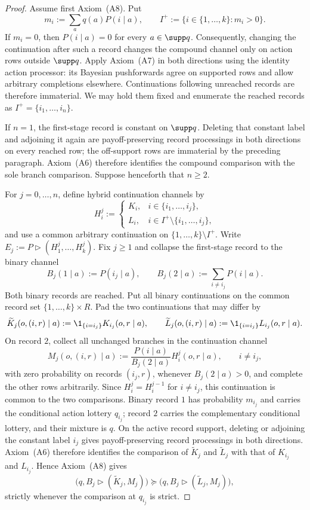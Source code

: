 \begin{proof}
Assume first Axiom~\textup{(A8)}.  Put
\[
 m_i:=\sum_aq(a)P(i\mid a),
 \qquad
 I^+:=\{i\in\{1,\ldots,k\}:m_i>0\}.
\]
If $m_i=0$, then $P(i\mid a)=0$ for every $a\in\supp q$.  Consequently, changing the continuation after such a
record changes the compound channel only on action rows outside $\supp q$.  Apply Axiom~\textup{(A7)} in both
directions using the identity action processor: its Bayesian pushforwards agree on supported rows and allow
arbitrary completions elsewhere.  Continuations following unreached records are therefore immaterial.  We may
hold them fixed and enumerate the reached records as $I^+=\{i_1,\ldots,i_n\}$.

If $n=1$, the first-stage record is constant on $\supp q$.  Deleting that
constant label and adjoining it again are payoff-preserving record processings
in both directions on every reached row; the off-support rows are immaterial
by the preceding paragraph.  Axiom~\textup{(A6)} therefore identifies the
compound comparison with the sole branch comparison.  Suppose henceforth that
$n\ge2$.

For $j=0,\ldots,n$, define hybrid continuation channels by
\[
 H_i^j:=
 \begin{cases}
 K_i,&i\in\{i_1,\ldots,i_j\},\\
 L_i,&i\in I^+\setminus\{i_1,\ldots,i_j\},
 \end{cases}
\]
and use a common arbitrary continuation on $\{1,\ldots,k\}\setminus I^+$.  Write
$E_j:=P\triangleright(H_1^j,\ldots,H_k^j)$.  Fix $j\ge1$ and collapse the first-stage record to the binary channel
\[
 B_j(1\mid a):=P(i_j\mid a),
 \qquad
 B_j(2\mid a):=\sum_{i\ne i_j}P(i\mid a).
\]
Both binary records are reached.  Put all binary continuations on the common record set
$\{1,\ldots,k\}\times R$.  Pad the
two continuations that may differ by
\[
 \widetilde K_j(o,(i,r)\mid a):=\1_{\{i=i_j\}}K_{i_j}(o,r\mid a),
 \qquad
 \widetilde L_j(o,(i,r)\mid a):=\1_{\{i=i_j\}}L_{i_j}(o,r\mid a).
\]
On record $2$, collect all unchanged branches in the continuation channel
\begin{equation}
 M_j(o,(i,r)\mid a)
 :=\frac{P(i\mid a)}{B_j(2\mid a)}H_i^j(o,r\mid a),
 \qquad i\ne i_j,
 \label{pt:eq:complement-continuation}
\end{equation}
with zero probability on records $(i_j,r)$, whenever $B_j(2\mid a)>0$, and complete the other rows arbitrarily.
Since $H_i^j=H_i^{j-1}$ for $i\ne i_j$, this continuation is common to the two comparisons.
Binary record $1$ has probability
$m_{i_j}$ and carries the conditional action lottery $q_{i_j}$; record $2$ carries the complementary conditional
lottery, and their mixture is $q$.  On the active record support, deleting or
adjoining the constant label $i_j$ gives payoff-preserving record processings
in both directions.  Axiom~\textup{(A6)} therefore identifies the comparison
of $\widetilde K_j$ and $\widetilde L_j$ with that of $K_{i_j}$ and $L_{i_j}$.
Hence Axiom~\textup{(A8)} gives
\[
 \bigl(q,B_j\triangleright(\widetilde K_j,M_j)\bigr)
 \succeq
 \bigl(q,B_j\triangleright(\widetilde L_j,M_j)\bigr),
\]
strictly whenever the comparison at $q_{i_j}$ is strict.


\end{proof}
